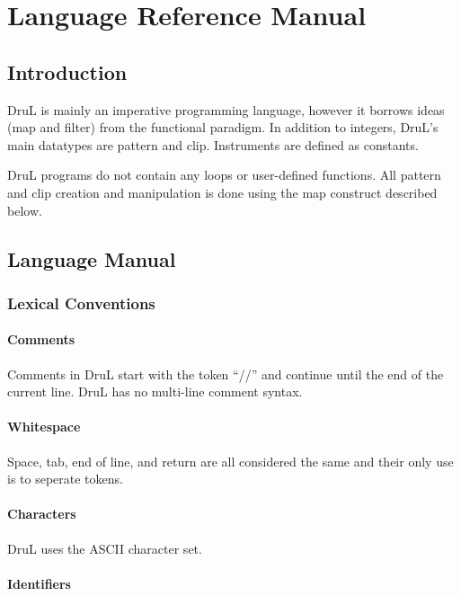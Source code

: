 \chapter{Language Reference Manual}
\section{Introduction}

DruL is mainly an imperative programming language, however it borrows ideas (map and filter) from the functional paradigm.  In addition to integers, DruL's main datatypes are pattern and clip. Instruments are defined as constants.

DruL programs do not contain any loops or user-defined functions.  All pattern
and clip creation and manipulation is done using the map construct described below.

\section{Language Manual}

\subsection{Lexical Conventions}

\subsubsection{Comments}

Comments in DruL start with the token ``//'' and continue until the end of the current line.
DruL has no multi-line comment syntax.

\subsubsection{Whitespace}

Space, tab, end of line, and return are all considered the same
and their only use is to seperate tokens.

\subsubsection{Characters}

DruL uses the ASCII character set.

\subsubsection{Identifiers}

